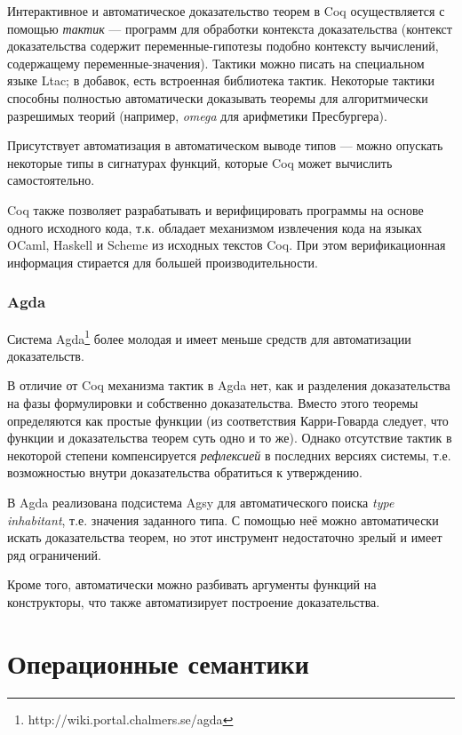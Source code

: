\documentclass[aps,12pt,final,oneside,onecolumn,musixtex,superscriptaddress,centertags]{article}
\begin{document}
     Интерактивное и автоматическое доказательство теорем в Coq осуществляется с помощью \emph{тактик} --- программ для обработки контекста доказательства (контекст доказательства содержит переменные-гипотезы подобно контексту вычислений, содержащему переменные-значения). Тактики можно писать на специальном языке Ltac; в добавок, есть встроенная библиотека тактик. Некоторые тактики способны полностью автоматически доказывать теоремы для алгоритмически разрешимых теорий (например, \emph{omega} для арифметики Пресбургера).

     Присутствует автоматизация в автоматическом выводе типов --- можно опускать некоторые типы в сигнатурах функций, которые Coq может вычислить самостоятельно.

     Coq также позволяет разрабатывать и верифицировать программы на основе одного исходного кода, т.к. обладает механизмом извлечения кода на языках OCaml, Haskell и Scheme из исходных текстов Coq. При этом верификационная информация стирается для большей производительности.

  \newpage
  \subsubsection{Agda}

     Система Agda\footnote{http://wiki.portal.chalmers.se/agda} более молодая и имеет меньше средств для автоматизации доказательств.

     В отличие от Coq механизма тактик в Agda нет, как и разделения доказательства на фазы формулировки и собственно доказательства. Вместо этого теоремы определяются как простые функции (из соответствия Карри-Говарда следует, что функции и доказательства теорем суть одно и то же). Однако отсутствие тактик в некоторой степени компенсируется \emph{рефлексией} в последних версиях системы, т.е. возможностью внутри доказательства обратиться к утверждению.

     В Agda реализована подсистема Agsy для автоматического поиска \emph{type inhabitant}, т.е. значения заданного типа. С помощью неё можно автоматически искать доказательства теорем, но этот инструмент недостаточно зрелый и имеет ряд ограничений.

     Кроме того, автоматически можно разбивать аргументы функций на конструкторы, что также автоматизирует построение доказательства.

  \newpage
  \section{Операционные семантики}
\end{document}
